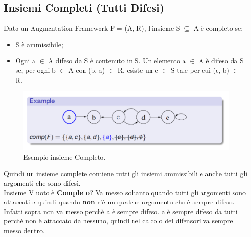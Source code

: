 \subsection{Insiemi Completi (Tutti Difesi)}
Dato un Augmentation Framework F = (A, R), l’insieme S $\subseteq$ A è completo se:
\begin{itemize}
    \item S è ammissibile;
    \item Ogni a $\in$ A difeso da S è contenuto in S. Un elemento a $\in$ A è difeso da S se, per ogni b $\in$ A con (b, a) $\in$ R, esiste un c $\in$ S tale per cui (c, b) $\in$ R.
\end{itemize}
\begin{figure}[htp]
	\centering
    \includegraphics[width=12cm, keepaspectratio]{img/Cap6/completo.png}
    \caption{Esempio insieme Completo.}
\end{figure}
Quindi un insieme complete contiene tutti gli insiemi ammissibili e anche tutti gli argomenti che sono difesi.
\\Insieme V uoto è \textbf{Completo}? Va messo soltanto quando tutti gli argomenti sono attaccati e quindi quando \textbf{non} c’è un qualche argomento che è sempre difeso. 
\\Infatti sopra non va messo perchè a è sempre difeso. a è sempre difeso da tutti perchè non è attaccato da nessuno, quindi nel calcolo dei difensori va sempre messo dentro.
